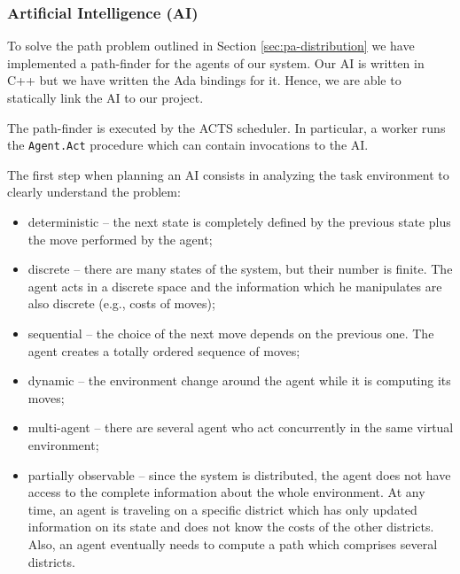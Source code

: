 \subsubsection{Artificial Intelligence (AI)}

To solve the path
problem outlined in Section \ref{sec:pa-distribution}
we have implemented a path-finder for the agents of our system.
Our AI is written in C++ but we have written the Ada bindings for it.
Hence, we are able to statically link the AI to our project.

The path-finder is executed by the ACTS scheduler. In particular, a
worker runs the \verb|Agent.Act| procedure which can contain invocations
to the AI.




The first step when planning an AI consists in analyzing the task environment
to clearly understand the problem:

\begin{itemize}

\item{deterministic} --
the next state is completely defined by the previous state plus the move
performed by the agent;

\item{discrete} --
there are many states of the system, but their number is finite.
The agent acts in a discrete space and the information which he manipulates
are also discrete (e.g., costs of moves);

\item{sequential} --
the choice of the next move depends on the previous one. The agent creates
a totally ordered sequence of moves;

\item{dynamic} --
the environment change around the agent while it is computing its moves;

\item{multi-agent} --
there are several agent who act concurrently in the same virtual
environment;

\item{partially observable} --
since the system is distributed, the agent does not have access to the complete
information about the whole environment. At any time, an agent is
traveling on a
specific district which has only updated information on its state and does not
know the costs of the other districts. Also, an agent eventually needs to
compute a path which comprises several districts.
\end{itemize}

